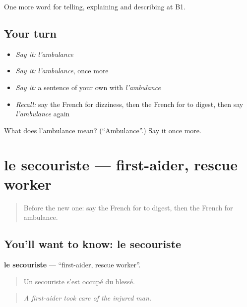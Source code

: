 \begin{grammarlens}[title={What you've built}]
One more word for telling, explaining and describing at B1.
\end{grammarlens}

\subsection*{Your turn}
\begin{itemize}
\raggedright
  \item \emph{Say it:} \emph{l'ambulance}
  \item \emph{Say it:} \emph{l'ambulance}, once more
  \item \emph{Say it:} a sentence of your own with \emph{l'ambulance}
  \item \emph{Recall:} say the French for dizziness, then the French for to digest, then say \emph{l'ambulance} again
\end{itemize}

\begin{tcolorbox}[breakable,colback=teal!4,colframe=teal!35!black,title={Before you move on}]
What does l'ambulance mean? (\textquotedblleft{}Ambulance\textquotedblright{}.) Say it once more.
\end{tcolorbox}
\section[le secouriste]{le secouriste — first-aider, rescue worker}

\label{lesson:FR-C484-secouriste}



\begin{quote}
Before the new one: say the French for to digest, then the French for ambulance.
\end{quote}

\subsection*{You'll want to know: le secouriste}
\textbf{le secouriste} — \textquotedblleft{}first-aider, rescue worker\textquotedblright{}.

\begin{quote}
Un secouriste s'est occupé du blessé.
\end{quote}

\begin{quote}
\emph{A first-aider took care of the injured man.}
\end{quote}

